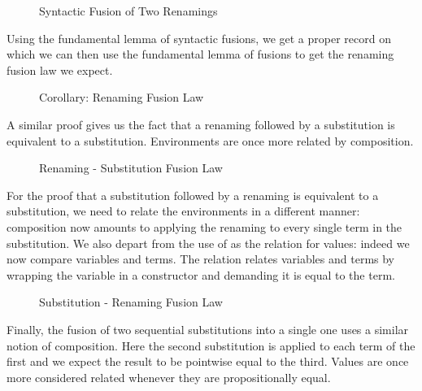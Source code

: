 \begin{figure}[h]
\caption{Syntactic Fusion of Two Renamings\label{fig:renrenfus}}
\end{figure}

Using the fundamental lemma of syntactic fusions, we get a proper  record
on which we can then use the fundamental lemma of fusions to get the renaming fusion
law we expect.

\begin{figure}[h]
\caption{Corollary: Renaming Fusion Law\label{fig:renren}}
\end{figure}

A similar proof gives us the fact that a renaming followed by a substitution is equivalent
to a substitution. Environments are once more related by composition.

\begin{figure}[h]
\caption{Renaming - Substitution Fusion Law\label{fig:rensub}}
\end{figure}

For the proof that a substitution followed by a renaming is equivalent to a substitution, we
need to relate the environments in a different manner: composition now amounts to applying
the renaming to every single term in the substitution. We also depart from the use of 
as the relation for values: indeed we now compare variables and terms. The relation 
relates variables and terms by wrapping the variable in a  constructor and demanding
it is equal to the term.

\begin{figure}[h]
\caption{Substitution - Renaming Fusion Law\label{fig:subren}}
\end{figure}

Finally, the fusion of two sequential substitutions into a single one uses a similar notion
of composition. Here the second substitution is applied to each term of the first and we
expect the result to be pointwise equal to the third. Values are once more considered related
whenever they are propositionally equal.

